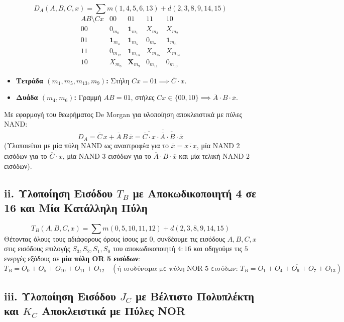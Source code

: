 \documentclass[11pt, a4paper]{article}
\begin{document}
\[
D_A(A, B, C, x) = \sum m(1, 4, 5, 6, 13) + d(2, 3, 8, 9, 14, 15)
\]
\[
\begin{array}{c|cccc}
AB \setminus Cx & 00 & 01 & 11 & 10 \\
\hline
00 & 0_{m_0} & \mathbf{1}_{m_1} & X_{m_3} & X_{m_2} \\
01 & \mathbf{1}_{m_4} & \mathbf{1}_{m_5} & 0_{m_7} & \mathbf{1}_{m_6} \\
11 & 0_{m_{12}} & \mathbf{1}_{m_{13}} & X_{m_{15}} & X_{m_{14}} \\
10 & X_{m_8} & \mathbf{X}_{m_9} & 0_{m_{11}} & 0_{m_{10}}
\end{array}
\]
\begin{itemize}[leftmargin=1.5em, noitemsep]
    \item \textbf{Τετράδα $(m_1, m_5, m_{13}, m_9)$:} Στήλη $Cx = 01 \implies \overline{C} \cdot x$.
    \item \textbf{Δυάδα $(m_4, m_6)$:} Γραμμή $AB = 01$, στήλες $Cx \in \{00, 10\} \implies \overline{A} \cdot B \cdot \overline{x}$.
\end{itemize}
Με εφαρμογή του θεωρήματος De Morgan για υλοποίηση αποκλειστικά με πύλες NAND:
\[
\boxed{D_A = \overline{C}\,x + \overline{A}\,B\,\overline{x} = \overline{\overline{\overline{C} \cdot x} \cdot \overline{\overline{A} \cdot B \cdot \overline{x}}}}
\]
(Υλοποιείται με μία πύλη NAND ως αναστροφέα για το $\overline{x} = \overline{x \cdot x}$, μία NAND 2 εισόδων για το $\overline{\overline{C}\cdot x}$, μία NAND 3 εισόδων για το $\overline{\overline{A}\cdot B \cdot \overline{x}}$ και μία τελική NAND 2 εισόδων).

\subsection*{ii. Υλοποίηση Εισόδου $T_B$ με Αποκωδικοποιητή 4 σε 16 και Μία Κατάλληλη Πύλη}

\[
T_B(A, B, C, x) = \sum m(0, 5, 10, 11, 12) + d(2, 3, 8, 9, 14, 15)
\]
Θέτοντας όλους τους αδιάφορους όρους ίσους με $0$, συνδέουμε τις εισόδους $A, B, C, x$ στις εισόδους επιλογής $S_3, S_2, S_1, S_0$ του αποκωδικοποιητή $4:16$ και οδηγούμε τις $5$ ενεργές εξόδους σε \textbf{μία πύλη OR 5 εισόδων}:
\[
\boxed{T_B = O_0 + O_5 + O_{10} + O_{11} + O_{12}} \quad \left(\text{ή ισοδύναμα με πύλη NOR 5 εισόδων: } \boxed{T_B = \overline{O_1 + O_4 + O_6 + O_7 + O_{13}}}\right)
\]

\subsection*{iii. Υλοποίηση Εισόδου $J_C$ με Βέλτιστο Πολυπλέκτη και $K_C$ Αποκλειστικά με Πύλες NOR}
\end{document}
